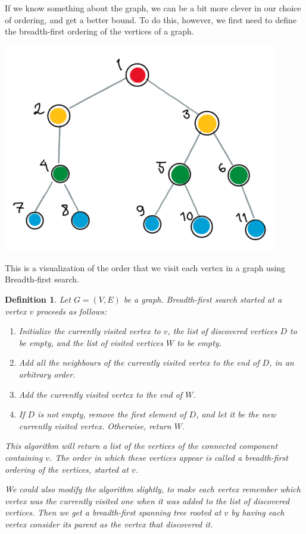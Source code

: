 \documentclass[nobib]{tufte-handout}
\newtheorem{definition}{Definition}
\begin{document}
If we know something about the graph, we can be a bit more clever in our choice of ordering, and get a better bound. To do this, however, we first need to define the breadth-first ordering of the vertices of a graph.
\begin{marginfigure}
    \centering
    \includegraphics[width=0.9\textwidth]{graphics/L12_colouring/BFS_visualization.png}
    \caption{
    This is a visualization of the order that we visit each vertex in a graph using Breadth-first search.
    }
\end{marginfigure}
\begin{definition}
  Let $G = (V,E)$ be a graph. \emph{Breadth-first search} started at a vertex $v$ proceeds as follows:
  \begin{enumerate}
    \item Initialize the \emph{currently visited vertex} to $v$, the list of \emph{discovered vertices} $D$ to be empty, and the list of \emph{visited vertices} $W$ to be empty.
    \item Add all the neighbours of the currently visited vertex to the end of $D$, in an arbitrary order.
    \item Add the currently visited vertex to the end of $W$.
    \item If $D$ is not empty, remove the first element of $D$, and let it be the new currently visited vertex. Otherwise, return $W$.
  \end{enumerate}

  This algorithm will return a list of the vertices of the connected component containing $v$. The order in which these vertices appear is called a \emph{breadth-first ordering} of the vertices, started at $v$. 
  
  We could also modify the algorithm slightly, to make each vertex remember which vertex was the currently visited one when it was added to the list of discovered vertices. Then we get a \emph{breadth-first spanning tree} rooted at $v$ by having each vertex consider its parent as the vertex that discovered it.
\end{definition}
\end{document}
